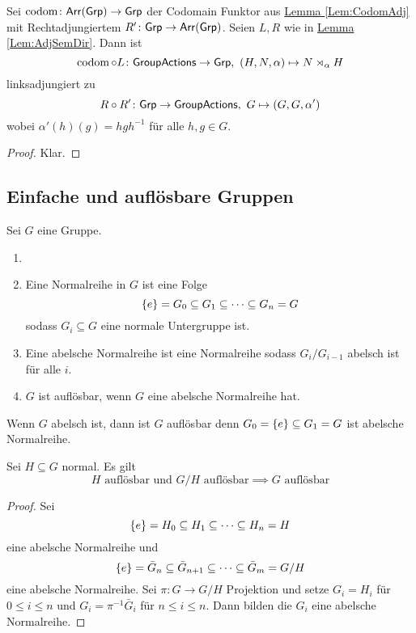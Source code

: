 \begin{Lemma}
    Sei \(\operatorname{codom}\colon \mathsf{Arr}(\mathsf{Grp})\to\mathsf{Grp}\) der Codomain Funktor aus \hyperref[Lem:CodomAdj]{Lemma \ref{Lem:CodomAdj}} mit Rechtadjungiertem \(R'\colon\mathsf{Grp}\to\mathsf{Arr}(\mathsf{Grp})\).
    Seien \(L,R\) wie in \hyperref[Lem:AdjSemDir]{Lemma \ref{Lem:AdjSemDir}}. Dann ist \[\codom\circ L\colon \Grpact\to \Grp,\ (H,N,\alpha)\mapsto N\rtimes_\alpha H\] linksadjungiert zu 
    \[R\circ R'\colon \mathsf{Grp}\to\mathsf{GroupActions},\ G\mapsto (G,G,\alpha')\] wobei \(\alpha'(h)(g)=hgh^{-1}\) für alle \(h,g\in G\).
\end{Lemma}
\begin{proof}
    Klar.
\end{proof}
    
\subsection{Einfache und auflösbare Gruppen}
Sei \(G\) eine Gruppe.
\begin{Def}
    \begin{enumerate}
        \item []
        \item Eine Normalreihe in \(G\) ist eine Folge \[\{e\}=G_0\subseteq G_1\subseteq \dots\subseteq G_n=G\] sodass \(G_i\subseteq G\) eine normale Untergruppe ist.
        \item Eine abelsche Normalreihe ist eine Normalreihe sodass \(G_i/G_{i-1}\) abelsch ist für alle \(i\).
        \item \(G\) ist auflösbar, wenn \(G\) eine abelsche Normalreihe hat.
    \end{enumerate}
\end{Def}
\begin{Bsp}
    Wenn \(G\) abelsch ist, dann ist \(G\) auflösbar denn \(G_0=\{e\}\subseteq G_1=G\) ist abelsche Normalreihe.
\end{Bsp}
\begin{Lemma}\label{Lem:AuflUntQuot}
    Sei \(H\subseteq G\) normal. Es gilt 
    \[H \text{ auflösbar und } G/H \text{ auflösbar}\implies G \text{ auflösbar}\]
\end{Lemma}
\begin{proof}
    Sei \[\{e\}=H_0\subseteq H_1\subseteq \dots\subseteq H_n=H\] eine abelsche Normalreihe und \[\{e\}=\bar G_n\subseteq\bar G_{n+1}\subseteq\dots \subseteq \bar G_m=G/H\] eine abelsche Normalreihe. Sei \(\pi\colon G\to G/H\) Projektion und setze \(G_i=H_i\) für \(0\leq i\leq n\) und \(G_i=\pi^{-1}\bar G_i\)  für \(n\leq i\leq n\).
    Dann bilden die \(G_i\) eine abelsche Normalreihe.
\end{proof}
